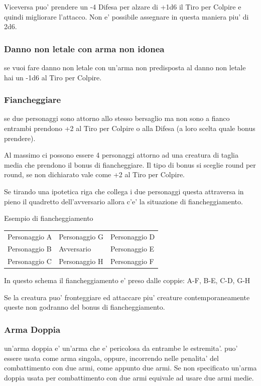 \documentclass[a4paper,11pt,twoside,openany]{dndbook}
\begin{document}
Viceversa puo' prendere un -4 Difesa per alzare di +1d6 il Tiro per Colpire e quindi migliorare l'attacco. Non e' possibile assegnare in questa maniera piu' di 2d6.

\subsubsection{Danno non letale con arma non idonea} se vuoi fare danno non letale con un'arma non predisposta al danno non letale hai un -1d6 al Tiro per Colpire.

\subsubsection{Fiancheggiare} se due personaggi sono attorno allo stesso bersaglio ma non sono a fianco entrambi prendono +2 al Tiro per Colpire o alla Difesa (a loro scelta quale bonus prendere).

Al massimo ci possono essere 4 personaggi attorno ad una creatura di taglia media che prendono il bonus di fiancheggiare. Il tipo di bonus si sceglie round per round, se non dichiarato vale come +2 al Tiro per Colpire.

Se tirando una ipotetica riga che collega i due personaggi questa attraversa in pieno il quadretto dell'avversario allora c'e' la situazione di fiancheggiamento.

\bigskip

Esempio di fiancheggiamento

\begin{tabular}[c]{@{}lll@{}}
\toprule 
Personaggio A & Personaggio G & Personaggio D\tabularnewline
Personaggio B & Avversario & Personaggio E\tabularnewline
Personaggio C & Personaggio H & Personaggio F\tabularnewline
\bottomrule
\end{tabular}

\bigskip

In questo schema il fiancheggiamento e' preso dalle coppie: A-F, B-E, C-D, G-H

\bigskip

Se la creatura puo' fronteggiare ed attaccare piu' creature contemporaneamente queste non godranno del bonus di fiancheggiamento.

\subsubsection{Arma Doppia} un'arma doppia e' un'arma che e' pericolosa da entrambe le estremita'. puo' essere usata come arma singola, oppure, incorrendo nelle penalita' del combattimento con due armi, come appunto due armi. Se non specificato un'arma doppia usata per combattimento con due armi equivale ad usare due armi medie.
\end{document}
